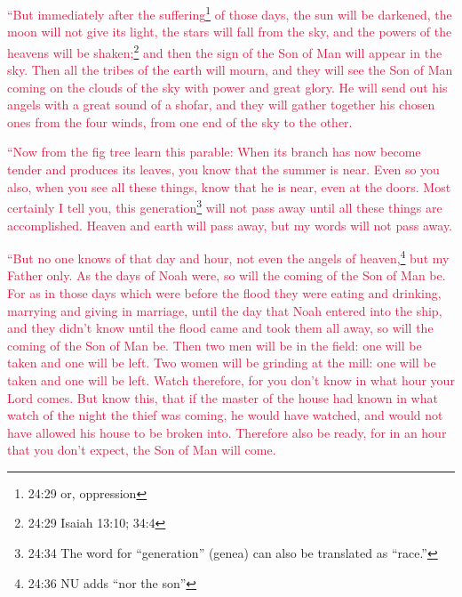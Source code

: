 \myverse{}\textcolor{crimson}{“But immediately after the suffering}\footnote{24:29 or, oppression}
\textcolor{crimson}{of those days, the sun will be darkened, the moon will not give its light, the stars will fall from
	the sky, and the powers of the heavens will be shaken;}\footnote{24:29 Isaiah 13:10;
	34:4
}
\myverse{}\textcolor{crimson}{and then the sign of the Son of Man will appear in the sky. Then all
	the tribes of the earth will mourn, and they will see the Son of Man coming on the clouds of the sky with
	power and great glory.
}
\myverse{}\textcolor{crimson}{He will send out his angels with a great sound of a shofar, and they
	will gather together his chosen ones from the four winds, from one end of the sky to the other.}

\myverse{}\textcolor{crimson}{“Now from the fig tree learn this parable: When its branch
	has now become tender and produces its leaves, you know that the summer is near.
}
\myverse{}\textcolor{crimson}{Even so you also, when you see all these things, know that he is near,
	even at the doors.
}
\myverse{}\textcolor{crimson}{Most certainly I tell you, this generation}\footnote{24:34 The word for “generation” (genea) can also be translated as “race.”}
\textcolor{crimson}{will not pass away until all these things are accomplished.
}
\myverse{}\textcolor{crimson}{Heaven and earth will pass away, but my words will not pass away.
}

\myverse{}\textcolor{crimson}{“But no one knows of that day and hour, not even the angels
	of heaven,}\footnote{24:36 NU adds “nor the son”}
\textcolor{crimson}{but my Father only.}
\myverse{}\textcolor{crimson}{As the days of Noah were, so will the coming of the Son of Man be.
}
\myverse{}\textcolor{crimson}{For as in those days which were before the flood they were eating and
	drinking, marrying and giving in marriage, until the day that Noah entered into the ship,
}
\myverse{}\textcolor{crimson}{and they didn’t know until the flood came and took them all away, so
	will the coming of the Son of Man be.
}
\myverse{}\textcolor{crimson}{Then two men will be in the field: one will be taken and one will be
	left.
}
\myverse{}\textcolor{crimson}{Two women will be grinding at the mill: one will be taken and one will
	be left.
}
\myverse{}\textcolor{crimson}{Watch therefore, for you don’t know in what hour your Lord comes.
}
\myverse{}\textcolor{crimson}{But know this, that if the master of the house had known in what watch
	of the night the thief was coming, he would have watched, and would not have allowed his house to be broken
	into.
}
\myverse{}\textcolor{crimson}{Therefore also be ready, for in an hour that you don’t expect, the Son
	of Man will come.}

